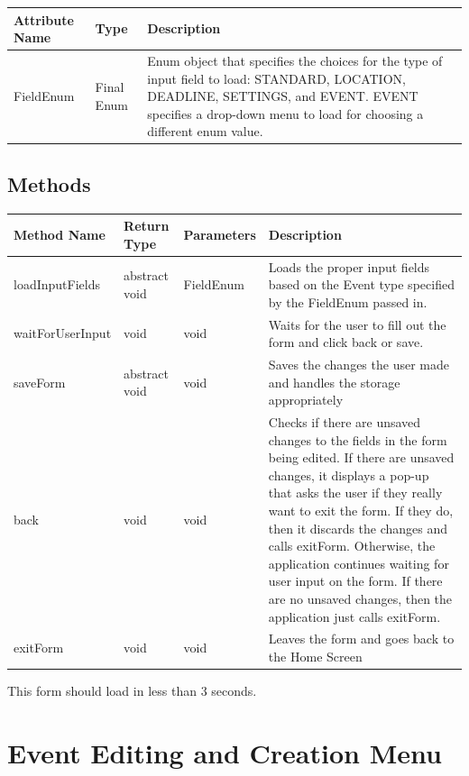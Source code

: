 \documentclass{scrreprt}
\begin{document}
\begin{center}
\begin{longtable}{ | p{3cm} | p{3cm} | p{9cm} | }
\hline
\textbf{Attribute Name} & \textbf{Type} & \textbf{Description} \\
\hline
FieldEnum & Final Enum & Enum object that specifies the choices for the type of input field to load: STANDARD, LOCATION, DEADLINE, SETTINGS, and EVENT.  EVENT specifies a drop-down menu to load for choosing a different enum value. \\
\hline
\end{longtable}
\end{center}

\subsection{Methods}

\begin{center}
\begin{longtable}{ | p{3cm} | p{2cm} | p{2cm} | p{8cm} | }
\hline
\textbf{Method Name} & \textbf{Return Type} & \textbf{Parameters} & \textbf{Description} \\
\hline
loadInputFields & abstract void & FieldEnum & Loads the proper input fields based on the Event type specified by the FieldEnum passed in.\\
\hline
waitForUserInput & void & void & Waits for the user to fill out the form and click back or save. \\
\hline
saveForm & abstract void & void & Saves the changes the user made and handles the storage appropriately \\
\hline
back & void & void & Checks if there are unsaved changes to the fields in the form being edited.  If there are unsaved changes, it displays a pop-up that asks the user if they really want to exit the form.  If they do, then it discards the changes and calls exitForm.  Otherwise, the application continues waiting for user input on the form.  If there are no unsaved changes, then the application just calls exitForm.\\
\hline
exitForm & void & void & Leaves the form and goes back to the Home Screen \\
\hline
\end{longtable}
\end{center}

This form should load in less than 3 seconds. \\

\section{Event Editing and Creation Menu}
\end{document}
